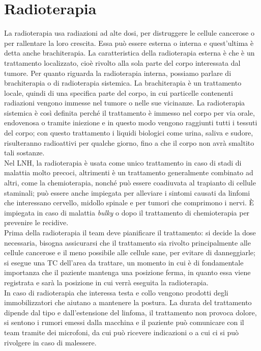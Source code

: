 \section{Radioterapia}
La radioterapia usa radiazioni ad alte dosi, per distruggere le cellule cancerose o per rallentare la loro crescita. 
Essa può essere esterna o interna e quest'ultima è detta anche brachiterapia. 
La caratteristica della radioterapia esterna è che è un trattamento localizzato, cioè rivolto alla sola parte 
del corpo interessata dal tumore. 
Per quanto riguarda la radioterapia interna, possiamo parlare di brachiterapia o di radioterapia sistemica. 
La brachiterapia è un trattamento locale, quindi di una specifica parte del corpo, in cui particelle contenenti 
radiazioni vengono immesse nel tumore o nelle sue vicinanze. 
La radioterapia sistemica è così definita perché il trattamento è immesso nel corpo per via orale, endovenosa o 
tramite iniezione e in questo modo vengono raggiunti tutti i tessuti del corpo; con questo trattamento i liquidi biologici 
come urina, saliva e sudore, risulteranno radioattivi per qualche giorno, fino a che il corpo non avrà smaltito 
tali sostanze\cite{NIH}.\\
Nel LNH, la radioterapia è usata come unico trattamento in caso di stadi di malattia molto precoci, 
altrimenti è un trattamento generalmente combinato ad altri, come la chemioterapia, nonché può essere 
coadiuvata al trapianto di cellule staminali; può essere anche impiegata per alleviare i sintomi causati da 
linfomi che interessano cervello, midollo spinale e per tumori che comprimono i nervi\cite{ACSRADIATION}.
È impiegata in caso di malattia \emph{bulky} o dopo il trattamento di chemioterapia per prevenire le recidive.\\

Prima della radioterapia il team deve pianificare il trattamento: si decide la dose necessaria, bisogna assicurarsi 
che il trattamento sia rivolto principalmente alle cellule cancerose e il meno possibile alle cellule sane, 
per evitare di danneggiarle; si esegue una TC dell’area da trattare, un momento in cui è di fondamentale importanza 
che il paziente mantenga una posizione ferma, in quanto essa viene registrata e sarà la posizione in cui verrà eseguita la 
radioterapia\cite{MACMILLAN}.\\
In caso di radioterapia che interessa testa e collo vengono prodotti degli immobilizzatori che aiutano a mantenere 
la postura. La durata del trattamento dipende dal tipo e dall’estensione del linfoma, il trattamento non provoca 
dolore, si sentono i rumori emessi dalla macchina e il paziente può comunicare con il team tramite dei microfoni, da cui 
può ricevere indicazioni o a cui ci si può rivolgere in caso di malessere\cite{UKRADIOTP}.

